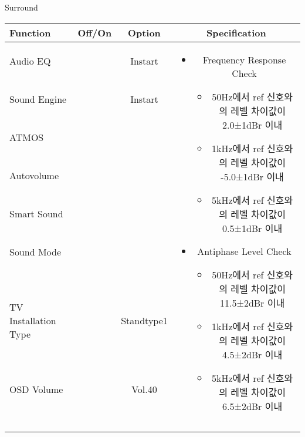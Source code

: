 \begin{frame}[t]{Surround}
\begin{tiny}
\begin{tabular}{@{}lccc@{}}
\toprule
Function & Off/On & Option & Specification \\
\midrule
Audio EQ & \color{black}{Off} & Instart &
\multirow{10}{60mm}{
\begin{itemize}
	\vspace{-3mm}
	\item Frequency Response Check
	\begin{itemize}
		\item 50Hz에서 ref 신호와의 레벨 차이값이 2.0±1dBr 이내
		\item 1kHz에서 ref 신호와의 레벨 차이값이 -5.0±1dBr 이내
		\item 5kHz에서 ref 신호와의 레벨 차이값이 0.5±1dBr 이내
	\end{itemize}
	\item Antiphase Level Check
	\begin{itemize}
		\item 50Hz에서 ref 신호와의 레벨 차이값이 11.5±2dBr 이내
		\item 1kHz에서 ref 신호와의 레벨 차이값이 4.5±2dBr 이내
		\item 5kHz에서 ref 신호와의 레벨 차이값이 6.5±2dBr 이내
	\end{itemize}
\end{itemize}
} \\
Sound Engine & \color{blue}{On} & Instart & \\
ATMOS & \color{black}{Off}  & & \\
Autovolume & \color{black}{Off} & & \\
Smart Sound & \color{black}{Off} & & \\
Sound Mode & \color{blue}{On} & \color{blue}{Surround} & \\
TV Installation Type & \color{blue}{On} & Standtype1 & \\
OSD Volume & \color{blue}{On} & Vol.40 & \\
& & & \\
& & & \\
& & & \\
& & & \\
\midrule
\end{tabular}
\end{tiny}


\end{frame}
